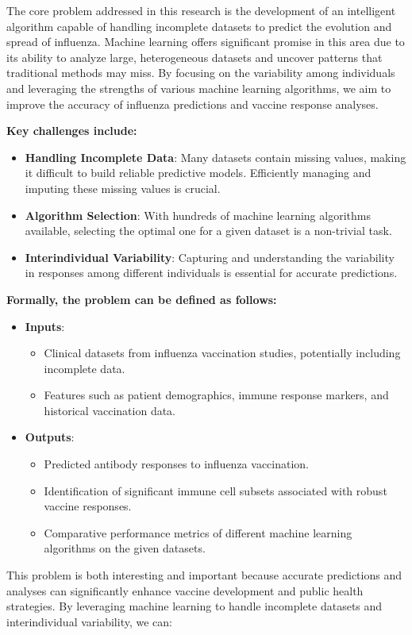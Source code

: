 \documentclass[runningheads,a4paper,11pt]{report}
\begin{document}
The core problem addressed in this research is the development of an intelligent algorithm capable of handling incomplete datasets to predict the evolution and spread of influenza. Machine learning offers significant promise in this area due to its ability to analyze large, heterogeneous datasets and uncover patterns that traditional methods may miss. By focusing on the variability among individuals and leveraging the strengths of various machine learning algorithms, we aim to improve the accuracy of influenza predictions and vaccine response analyses.

\textbf{Key challenges include:}

\begin{itemize}
    \item \textbf{Handling Incomplete Data}: Many datasets contain missing values, making it difficult to build reliable predictive models. Efficiently managing and imputing these missing values is crucial.
    \item \textbf{Algorithm Selection}: With hundreds of machine learning algorithms available, selecting the optimal one for a given dataset is a non-trivial task.
    \item \textbf{Interindividual Variability}: Capturing and understanding the variability in responses among different individuals is essential for accurate predictions.
\end{itemize}



\textbf{Formally, the problem can be defined as follows:}

\begin{itemize}
    \item \textbf{Inputs}:
    \begin{itemize}
        \item Clinical datasets from influenza vaccination studies, potentially including incomplete data.
        \item Features such as patient demographics, immune response markers, and historical vaccination data.
    \end{itemize}
    \item \textbf{Outputs}:
    \begin{itemize}
        \item Predicted antibody responses to influenza vaccination.
        \item Identification of significant immune cell subsets associated with robust vaccine responses.
        \item Comparative performance metrics of different machine learning algorithms on the given datasets.
    \end{itemize}
\end{itemize}
This problem is both interesting and important because accurate predictions and analyses can significantly enhance vaccine development and public health strategies. By leveraging machine learning to handle incomplete datasets and interindividual variability, we can:
\end{document}
